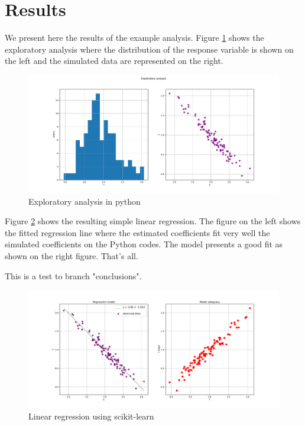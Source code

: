 \section{Results}


We present here the results of the example analysis. Figure \ref{fig:exploratory_analysis} shows the exploratory analysis where the distribution of the response variable is shown on the left and the simulated data are represented on the right.

\begin{figure}
\centering
\includegraphics[width=\textwidth]{figures/fig_exploratory_analysis.pdf}
\caption{Exploratory analysis in python}
\label{fig:exploratory_analysis}
\end{figure}

Figure \ref{fig:linear_regression} shows the resulting simple linear regression. The figure on the left shows the fitted regression line where the estimated coefficients fit very well the simulated coefficients on the Python codes. The model presents a good fit as shown on the right figure. That's all.

This is a test to branch "conclusions".

\begin{figure}
\centering
\includegraphics[width=\textwidth]{figures/fig_linear_regression.pdf}
\caption{Linear regression using scikit-learn}
\label{fig:linear_regression}
\end{figure}